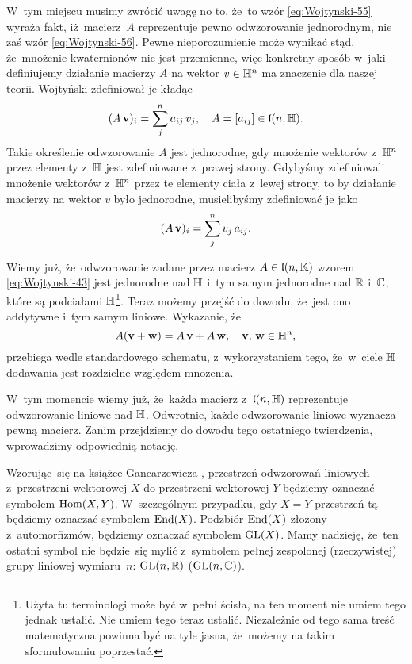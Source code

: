 \documentclass[a4paper,11pt]{article}
\begin{document}
W~tym miejscu musimy zwrócić uwagę no to, że~to wzór \eqref{eq:Wojtynski-55}
wyraża fakt, iż~macierz~$A$ reprezentuje pewno odwzorowanie jednorodnym,
nie zaś wzór \eqref{eq:Wojtynski-56}. Pewne nieporozumienie może wynikać
stąd, że~mnożenie kwaternionów nie jest przemienne, więc konkretny sposób
w~jaki definiujemy działanie macierzy $A$ na wektor $v \in \mathbb{H}^{ n }$ ma
znaczenie dla naszej teorii. Wojtyński zdefiniował je kładąc
\begin{equation}
  \label{eq:Wojtynski-59}
  ( A \, \mathbf{v} )_{ i } = \sum_{ j }^{ n } a_{ i j } \, v_{ j }, \quad
  A = [ a_{ ij } ] \in \mathfrak{l}( n, \mathbb{H} ).
\end{equation}
Takie określenie odwzorowanie $A$ jest jednorodne, gdy mnożenie wektorów
z~$\mathbb{H}^{ n }$ przez elementy z~$\mathbb{H}$ jest zdefiniowane z~prawej strony.
Gdybyśmy zdefiniowali mnożenie wektorów z~$\mathbb{H}^{ n }$ przez te elementy
ciała z~lewej strony, to by działanie macierzy na wektor $v$ było
jednorodne, musielibyśmy zdefiniować je jako
\begin{equation}
  \label{eq:Wojtynski-60}
  ( A \, \mathbf{v} )_{ i } = \sum_{ j }^{ n } v_{ j } \, a_{ i j }.
\end{equation}

Wiemy już, że~odwzorowanie zadane przez macierz $A \in \mathfrak{l}( n, \mathbb{K} )$
wzorem \eqref{eq:Wojtynski-43} jest jednorodne nad $\mathbb{H}$ i~tym samym
jednorodne nad $\mathbb{R}$ i~$\mathbb{C}$, które są podciałami $\mathbb{H}$\footnote{Użyta
  tu terminologi może być w~pełni ścisła, na ten moment nie umiem tego
  jednak ustalić. Nie umiem tego teraz ustalić. Niezależnie od tego sama
  treść matematyczna powinna być na tyle jasna, że~możemy na takim
  sformułowaniu poprzestać.}. Teraz możemy przejść do dowodu, że~jest ono
addytywne i~tym samym liniowe. Wykazanie, że
\begin{equation}
  \label{eq:Wojtynski-61}
  A ( \mathbf{v} + \mathbf{w} ) = A \, \mathbf{v} + A \, \mathbf{w}, \quad
  \mathbf{v}, \, \mathbf{w} \in \mathbb{H}^{ n },
\end{equation}
przebiega wedle standardowego schematu, z~wykorzystaniem tego, że~w~ciele
$\mathbb{H}$ dodawania jest rozdzielne względem mnożenia.

W~tym momencie wiemy już, że~każda macierz z~$\mathfrak{l}( n, \mathbb{H} )$
reprezentuje odwzorowanie liniowe nad $\mathbb{H}$. Odwrotnie, każde odwzorowanie
liniowe wyznacza pewną macierz. Zanim przejdziemy do dowodu tego ostatniego twierdzenia, wprowadzimy odpowiednią notację.

Wzorując~się na książce Gancarzewicza
\cite{GancarzewiczAlgebraLiniowa2004}, przestrzeń odwzorowań liniowych
z~przestrzeni wektorowej $X$ do przestrzeni wektorowej $Y$ będziemy
oznaczać symbolem $\mathrm{Hom}( X, Y )$. W~szczególnym przypadku, gdy $X = Y$
przestrzeń tą będziemy oznaczać symbolem $\mathrm{End}( X )$. Podzbiór $\mathrm{End}( X )$
złożony z~automorfizmów, będziemy oznaczać symbolem $\mathrm{GL}( X )$. Mamy
nadzieję, że~ten ostatni symbol nie będzie~się mylić z~symbolem pełnej
zespolonej (rzeczywistej) grupy liniowej wymiaru~$n$: $\mathrm{GL}( n, \mathbb{R} )$
($\mathrm{GL}( n, \mathbb{C} )$).
\end{document}
